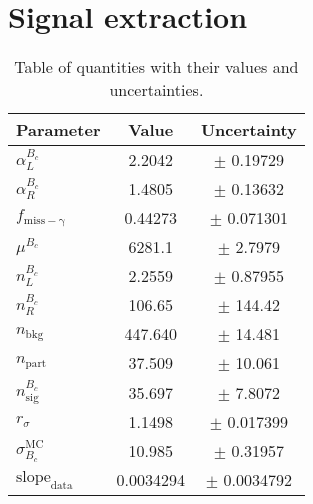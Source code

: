 \clearpage
\newpage
\section{Signal extraction}\label{sec:fit}




\newpage
\begin{table}[h!]
\centering
\begin{tabular}{l c c}
\hline
Parameter & Value & Uncertainty \\
\hline
$\alpha_L^{B_c}$ & 2.2042 & $\pm$ 0.19729 \\
$\alpha_R^{B_c}$ & 1.4805 & $\pm$ 0.13632 \\
$f_\mathrm{miss-\gamma}$ & 0.44273 & $\pm$ 0.071301 \\
$\mu^{B_c}$ & 6281.1 & $\pm$ 2.7979 \\
$n_L^{B_c}$ & 2.2559 & $\pm$ 0.87955 \\
$n_R^{B_c}$ & 106.65 & $\pm$ 144.42 \\
$n_{\text{bkg}}$ & 447.640 & $\pm$ 14.481 \\
$n_{\text{part}}$ & 37.509 & $\pm$ 10.061 \\
$n_{\text{sig}}^{B_c}$ &35.697 & $\pm$ 7.8072 \\
$r_{\sigma}$ & 1.1498 & $\pm$ 0.017399 \\
$\sigma_{B_c}^{\text{MC}}$ & 10.985 & $\pm$ 0.31957 \\
$\text{slope}_{\text{data}}$ & 0.0034294 & $\pm$ 0.0034792 \\
\hline
\end{tabular}
\caption{Table of quantities with their values and uncertainties.}
\label{tab:quantities}
\end{table}


